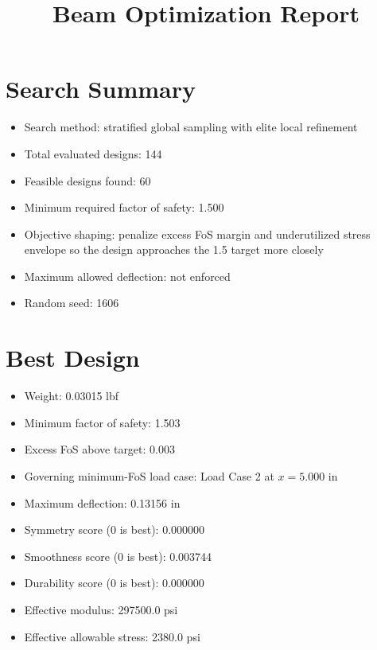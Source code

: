 \documentclass[11pt]{article}
\title{Beam Optimization Report}
\date{}
\begin{document}
\maketitle

\section*{Search Summary}
\begin{itemize}
\item Search method: stratified global sampling with elite local refinement
\item Total evaluated designs: 144
\item Feasible designs found: 60
\item Minimum required factor of safety: 1.500
\item Objective shaping: penalize excess FoS margin and underutilized stress envelope so the design approaches the 1.5 target more closely
\item Maximum allowed deflection: not enforced
\item Random seed: 1606
\end{itemize}

\section*{Best Design}
\begin{itemize}
\item Weight: 0.03015 lbf
\item Minimum factor of safety: 1.503
\item Excess FoS above target: 0.003
\item Governing minimum-FoS load case: Load Case 2 at $x=5.000$ in
\item Maximum deflection: 0.13156 in
\item Symmetry score (0 is best): 0.000000
\item Smoothness score (0 is best): 0.003744
\item Durability score (0 is best): 0.000000
\item Effective modulus: 297500.0 psi
\item Effective allowable stress: 2380.0 psi
\end{itemize}
\end{document}
